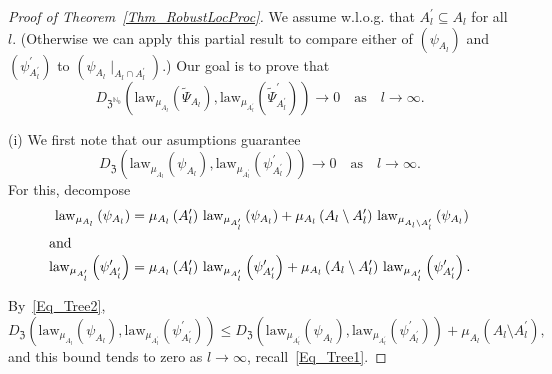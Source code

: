 \documentclass[AHL,Unicode,longabstracts]{cedram}
\newcommand{\law}{\mathrm{law}}
\newcommand{\frkZ}{\mathfrak{Z}}
\newcommand{\bbN}{\mathbb{N}}
\begin{document}
\begin{proof}[{Proof of Theorem~\ref{Thm_RobustLocProc}}]
We assume w.l.o.g. that $A_{l}^{\prime}\subseteq A_{l}$ for all $l$. (Otherwise we can apply this partial result to compare either of $(\psi_{A_{l}})$ and $(\psi_{A_{l} ^{\prime}}^{\prime})$ to $(\psi_{A_{l}}\mid_{A_{l}\cap A_{l}^{\prime}})$.) Our goal is to prove that
\begin{equation}\label{Eq_RobustLocProcMetric}
D_{\frkZ^{\bbN_{0}}}\left(\law_{\mu_{A_{l}}}\left(\widetilde{\Psi }_{A_{l}}\right),\law_{\mu_{A_{l}^{\prime}}}\left(\widetilde{\Psi}_{A_{l} ^{\prime}}^{\prime}\right)\right)\longrightarrow0\quad\text{as}\quad l\rightarrow
\infty. 
\end{equation}

\noindent (i) We first note that our asumptions guarantee
\begin{equation}\label{Eq_idimRobust}
D_{\frkZ}\left(\law_{\mu_{A_{l}}}\left(\psi_{A_{l}}\right),\law _{\mu_{A_{l}^{\prime}}}\left(\psi_{A_{l}^{\prime}}^{\prime}\right)\right)\longrightarrow0\quad \text{as}\quad l\rightarrow\infty. 
\end{equation}
For this, decompose
\begin{align*}
\law_{\mu_{A_{l}}}\left(\psi_{A_{l}}\right)&=\mu_{A_{l} }\left(A_{l}^{\prime}\right)\,\law_{\mu_{A_{l}^{\prime}}}\left(\psi_{A_{l}}\right)+\mu_{A_{l}}\left(A_{l}\setminus A_{l}^{\prime}\right)\,\law_{\mu_{A_{l}
\setminus A_{l}^{\prime}}}\left(\psi_{A_{l}}\right)\\
 \intertext{and}
 \law_{\mu _{A_{l}^{\prime}}}\left(\psi_{A_{l}^{\prime}}^{\prime}\right)&=\mu_{A_{l}}\left(A_{l}^{\prime }\right)\,\law_{\mu_{A_{l}^{\prime}}}\left(\psi_{A_{l}^{\prime}}^{\prime}\right)+\mu_{A_{l}}\left(A_{l}\setminus A_{l}^{\prime}\right)\,\law_{\mu_{A_{l} ^{\prime}}}\left(\psi_{A_{l}^{\prime}}^{\prime}\right).
\end{align*}

By~\eqref{Eq_Tree2},
\[
D_{\frkZ}\left(\law_{\mu_{A_{l}}}\left(\psi_{A_{l}}\right),\law _{\mu_{A_{l}^{\prime}}}\left(\psi_{A_{l}^{\prime}}^{\prime}\right)\right)\leq D_{\frkZ }\left(\law_{\mu_{A_{l}^{\prime}}}\left(\psi_{A_{l}}\right),\law_{\mu _{A_{l}^{\prime}}}\left(\psi_{A_{l}^{\prime}}^{\prime}\right)\right)+\mu_{A_{l}}\left(A_{l}\setminus A_{l}^{\prime}\right),
\]
and this bound tends to zero as $l\rightarrow\infty$, recall~\eqref{Eq_Tree1}.


\end{proof}
\end{document}
